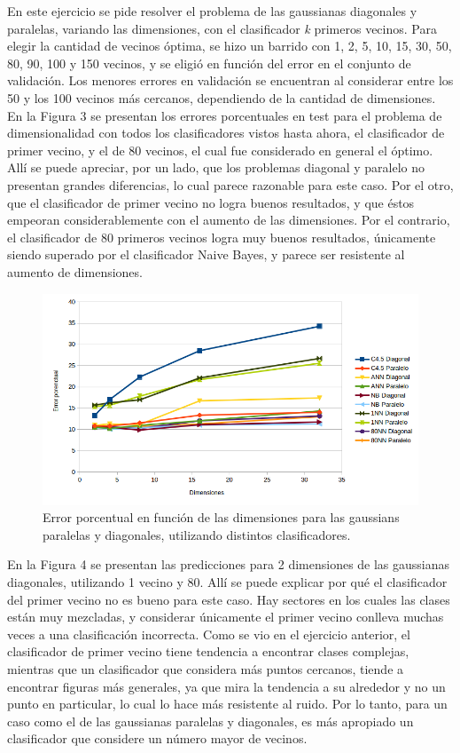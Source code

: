 \documentclass[12pt, a4paper]{article}
\begin{document}
En este ejercicio se pide resolver el problema de las gaussianas diagonales y paralelas, variando las dimensiones, con el clasificador \textit{k} primeros vecinos. Para elegir la cantidad de vecinos óptima, se hizo un barrido con 1, 2,	5,	10, 15, 30, 50, 80, 90, 100 y 150 vecinos, y se eligió en función del error en el conjunto de validación. Los menores errores en validación se encuentran al considerar entre los 50 y los 100 vecinos más cercanos, dependiendo de la cantidad de dimensiones. En la Figura 3 se presentan los errores porcentuales en test para el problema de dimensionalidad con todos los clasificadores vistos hasta ahora, el clasificador de primer vecino, y el de 80 vecinos, el cual fue considerado en general el óptimo. Allí se puede apreciar, por un lado, que los problemas diagonal y paralelo no presentan grandes diferencias, lo cual parece razonable para este caso. Por el otro, que el clasificador de primer vecino no logra buenos resultados, y que éstos empeoran considerablemente con el aumento de las dimensiones. Por el contrario, el clasificador de 80 primeros vecinos logra muy buenos resultados, únicamente siendo superado por el clasificador Naive Bayes, y parece ser resistente al aumento de dimensiones.

 \begin{figure}
    \centering
	\includegraphics[scale=0.8]{ejercicioc}
	\caption{Error porcentual en función de las dimensiones para las gaussians paralelas y diagonales, utilizando distintos clasificadores.}
\end{figure}

En la Figura 4 se presentan las predicciones para 2 dimensiones de las gaussianas diagonales, utilizando 1 vecino y 80. Allí se puede explicar por qué el clasificador del primer vecino no es bueno para este caso. Hay sectores en los cuales las clases están muy mezcladas, y considerar únicamente el primer vecino conlleva muchas veces a una clasificación incorrecta. Como se vio en el ejercicio anterior, el clasificador de primer vecino tiene tendencia a encontrar clases complejas, mientras que un clasificador que considera más puntos cercanos, tiende a encontrar figuras más generales, ya que mira la tendencia a su alrededor y no un punto en particular, lo cual lo hace más resistente al ruido. Por lo tanto, para un caso como el de las gaussianas paralelas y diagonales, es más apropiado un clasificador que considere un número mayor de vecinos.
\end{document}

